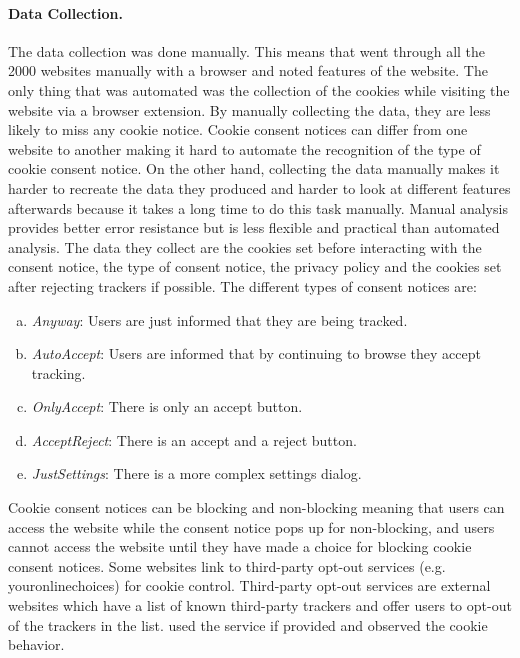 \paragraph{Data Collection.}
The data collection was done manually. This means that \citeauthor{sanchez2019can} went through all the 2000 websites
manually with a browser and noted features of the website. The only thing that was automated was the collection of the
cookies while visiting the website via a browser extension. By manually collecting the data, they are less likely to miss any cookie notice.
Cookie consent notices can differ from one website to another making it hard to
automate the recognition of the type of cookie consent notice. On the other hand, collecting the data manually makes it harder to recreate the data they produced
and harder to look at different features afterwards because it takes a long time to do this task manually.
Manual analysis provides better error resistance but is
less flexible and practical than automated analysis. The data they collect are the cookies set before interacting with the
consent notice, the type of consent notice, the privacy policy and the cookies set after rejecting trackers if possible.
The different types of consent notices are:
\begin{enumerate}[a)]
    \item \emph{Anyway}: Users are just informed that they are being tracked.
    \item \emph{AutoAccept}: Users are informed that by continuing to browse they accept tracking.
    \item \emph{OnlyAccept}: There is only an accept button.
    \item \emph{AcceptReject}: There is an accept and a reject button.
    \item \emph{JustSettings}: There is a more complex settings dialog.
\end{enumerate}
Cookie consent notices can be blocking and non-blocking meaning that users can access the website while the consent notice pops up for
non-blocking, and users cannot access the website until they have made a choice for blocking cookie consent notices. Some
websites link to third-party opt-out services (e.g. youronlinechoices) for cookie control. Third-party opt-out services
are external websites which have a list of known third-party trackers and offer users to opt-out of the trackers in
the list. \citeauthor{sanchez2019can} used the service if provided and observed the cookie behavior.

